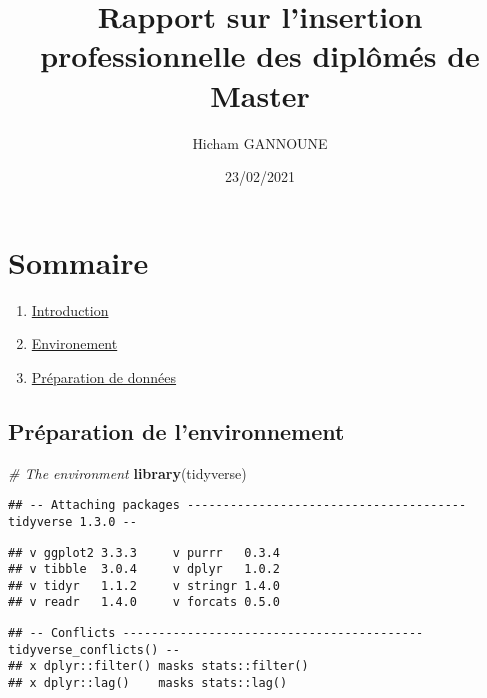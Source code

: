 \documentclass[
]{article}
\title{Rapport sur l'insertion professionnelle des diplômés de Master}
\author{Hicham GANNOUNE}
\date{23/02/2021}
\newenvironment{Shaded}{\begin{snugshade}}{\end{snugshade}}
\newcommand{\CommentTok}[1]{\textcolor[rgb]{0.56,0.35,0.01}{\textit{#1}}}
\newcommand{\KeywordTok}[1]{\textcolor[rgb]{0.13,0.29,0.53}{\textbf{#1}}}
\newcommand{\NormalTok}[1]{#1}
\providecommand{\tightlist}{%
  \setlength{\itemsep}{0pt}\setlength{\parskip}{0pt}}
\begin{document}
\maketitle

\hypertarget{sommaire}{%
\section{Sommaire}\label{sommaire}}

\begin{enumerate}
\def\labelenumi{\arabic{enumi}.}
\tightlist
\item
  \protect\hyperlink{introduction}{Introduction}\\
\item
  \protect\hyperlink{Pruxe9parationux5cux2520deux5cux2520lux27environnement}{Environement}\\
\item
  \protect\hyperlink{Tuxe9lechargementux5cux2520desux5cux2520donnuxe9es}{Préparation
  de données}
\end{enumerate}

\hypertarget{pruxe9paration-de-lenvironnement}{%
\subsection{Préparation de
l'environnement}\label{pruxe9paration-de-lenvironnement}}

\begin{Shaded}
\begin{Highlighting}[]
\CommentTok{# The environment}
\KeywordTok{library}\NormalTok{(tidyverse)}
\end{Highlighting}
\end{Shaded}

\begin{verbatim}
## -- Attaching packages --------------------------------------- tidyverse 1.3.0 --
\end{verbatim}

\begin{verbatim}
## v ggplot2 3.3.3     v purrr   0.3.4
## v tibble  3.0.4     v dplyr   1.0.2
## v tidyr   1.1.2     v stringr 1.4.0
## v readr   1.4.0     v forcats 0.5.0
\end{verbatim}

\begin{verbatim}
## -- Conflicts ------------------------------------------ tidyverse_conflicts() --
## x dplyr::filter() masks stats::filter()
## x dplyr::lag()    masks stats::lag()
\end{verbatim}
\end{document}
